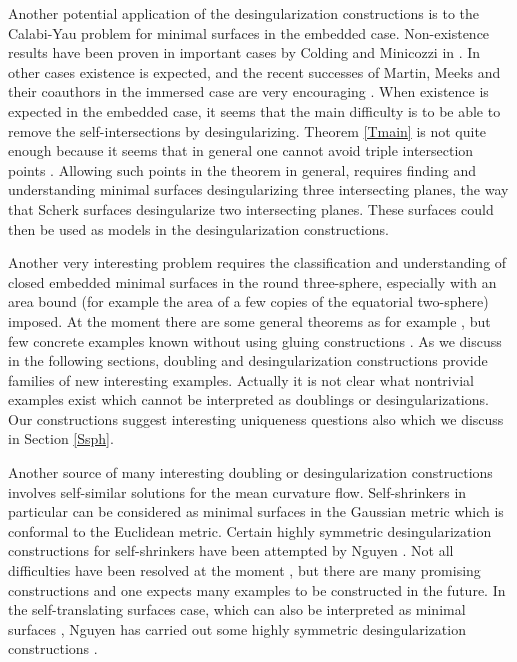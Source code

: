 \documentclass[12pt,namelimits,sumlimits]{amsart}
\theoremstyle{remark}
\numberwithin{equation}{section}
\begin{document}
Another potential application of the desingularization constructions is
to the Calabi-Yau problem for minimal surfaces in the embedded case.
Non-existence results have been proven in important cases by Colding and Minicozzi in \cite{CoMi}.
In other cases existence is expected,
and the recent successes of Martin, Meeks and their coauthors in the immersed case 
are very encouraging \cite{53,54}.
When existence is expected in the embedded case,
it seems that the main difficulty is to be able to remove the self-intersections by desingularizing.
Theorem \ref{Tmain} is not quite enough because it seems that in general one cannot
avoid triple intersection points \cite{pers}.
Allowing such points in the theorem in general,
requires finding and understanding minimal surfaces desingularizing three intersecting planes,
the way that Scherk surfaces desingularize two intersecting planes.
These surfaces could then be used as models in the desingularization constructions.

Another very interesting problem requires the classification and understanding of closed embedded
minimal surfaces in the round three-sphere, especially with an area bound (for example
the area of a few copies of the equatorial two-sphere) imposed.
At the moment there are some general theorems as for example \cite{choi:schoen,li:yau},
but few concrete examples known without using gluing constructions
\cite{L2,Ka3,PRu,KPS}.
As we discuss in the following sections, doubling \cite{kapouleas:clifford,kapouleas:equator}
and desingularization \cite{kapouleas:nested} constructions provide families of new interesting examples.
Actually it is not clear what nontrivial examples exist which cannot be interpreted as doublings or desingularizations.
Our constructions suggest interesting uniqueness questions also which we discuss in Section \ref{Ssph}.

Another source of many interesting doubling or desingularization constructions involves self-similar solutions for the mean curvature flow.
Self-shrinkers in particular can be considered as minimal surfaces in the Gaussian metric which is conformal to the Euclidean metric.
Certain highly symmetric desingularization constructions for self-shrinkers have been attempted by Nguyen \cite{nguyen1,nguyen3}.
Not all difficulties have been resolved at the moment \cite{nguyen5},
but there are many promising constructions and one expects many examples to be constructed in the future.
In the self-translating surfaces case, which can also be interpreted as minimal surfaces \cite{solitons},
Nguyen has carried out some highly symmetric desingularization constructions
\cite{nguyen2,nguyen4}.
\end{document}

